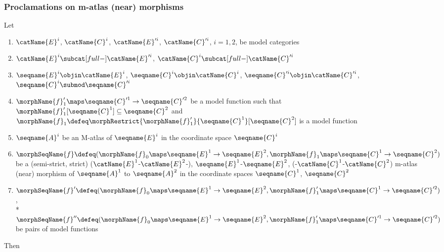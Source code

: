 \documentclass{article}
\begin{document}
\subsubsection{Proclamations on m-atlas (near) morphisms}
\begin{lemma}
\label{lem:M-ATLmorph}
Let
\begin{enumerate}
\item
$\catName{E}^i$, $\catName{C}^i$,
$\catName{E}'^i$, $\catName{C}'^i$, $i=1,2$, be model categories

\item
$\catName{E}^i \subcat[full-] \catName{E}'^i$,
$\catName{C}^i \subcat[full-] \catName{C}'^i$

\item
$\seqname{E}^i \objin \catName{E}^i$,
$\seqname{C}^i \objin \catName{C}^i$,
$\seqname{C}'^i \objin \catName{C}'^i$,
$\seqname{C}^i \submod \seqname{C}'^i$

\item
$\morphName{f}'_1 \maps \seqname{C}'^1 \to \seqname{C}'^2$ be a model
function such that
$\morphName{f}'_1[\seqname{C}^1] \subseteq \seqname{C}^2$ and
$
  \morphName{f}_1 \defeq
  \morphRestrict{\morphName{f}'_1}{\seqname{C}^1}[\seqname{C}^2]
$
is a model function

\item
$\seqname{A}^i$ be an M-atlas
of $\seqname{E}^i$ in the coordinate space $\seqname{C}^i$

\item
$
  \morphSeqName{f} \defeq
  (
    \morphName{f}_0 \maps \seqname{E}^1 \to \seqname{E}^2,
    \morphName{f}_1 \maps \seqname{C}^1 \to \seqname{C}^2
  )
$
be a (semi-strict, strict)
\nobreaks
  {
    {($\catName{E}^1$-$\catName{E}^2$-)},
    {$\seqname{E}^1$-$\seqname{E}^2$},
    {(-$\catName{C}^1$-$\catName{C}^2$)}
  }
m-atlas (near) morphism of $\seqname{A}^1$ to $\seqname{A}^2$ in the
coordinate spaces $\seqname{C}^1$, $\seqname{C}^2$

\item
$
  \morphSeqName{f}' \defeq
  (
    \morphName{f}_0 \maps \seqname{E}^1 \to \seqname{E}^2,
    \morphName{f}'_1 \maps \seqname{C}^1 \to \seqname{C}'^2
  )
$, \\*
$
  \morphSeqName{f}'' \defeq
  (
    \morphName{f}_0 \maps \seqname{E}^1 \to \seqname{E}^2,
    \morphName{f}'_1 \maps \seqname{C}'^1 \to \seqname{C}'^2
  )
$
be pairs of model functions
\end{enumerate}

Then


\end{lemma}
\end{document}
